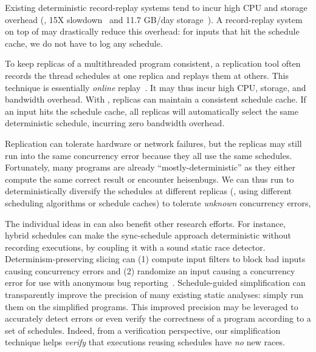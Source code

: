  Existing deterministic record-replay systems
tend to incur high CPU and storage overhead (\eg, 15X
slowdown~\cite{idna:vee06} and 11.7 GB/day
storage~\cite{smp-revirt:vee08}).  A record-replay system on top of \peregrine
may drastically reduce this overhead: for inputs that hit the
schedule cache, we do not have to
log any schedule.

To keep replicas of a multithreaded program consistent, a replication tool
often records the thread schedules at one replica and replays them at
others.  This technique is essentially \emph{online}
replay~\cite{respec:asplos10}.
It may thus incur high CPU, storage, and
bandwidth overhead.  With \peregrine, replicas can maintain a consistent
schedule cache.  If an input hits the schedule cache, all replicas will
automatically select the same deterministic schedule, incurring zero
bandwidth overhead.

  Replication can tolerate
hardware or network failures, but the replicas may still run into the same
concurrency error because they all use the same schedules.  Fortunately,
many programs are already ``mostly-deterministic'' as they either compute
the same correct result or encounter heisenbugs.  We can thus run \peregrine to
deterministically diversify the schedules at different replicas (\eg,
using different scheduling algorithms or schedule caches) to tolerate
\emph{unknown} concurrency errors,

 The individual ideas in \peregrine
can also benefit other research efforts.  For instance, hybrid schedules
can make the sync-schedule approach deterministic without recording
executions, by coupling it with a sound static race detector.
Determinism-preserving slicing can (1) compute input filters to block bad
inputs~\cite{castro:bouncer} causing concurrency errors and (2) randomize
an input causing a concurrency error for use with anonymous bug
reporting~\cite{castro:bug-report-privacy}.  Schedule-guided
simplification can transparently improve the precision of many existing
static analyses: simply run them on the simplified programs.  This improved
precision may be leveraged to accurately detect errors or even
verify the correctness of a program according to a set of schedules.
Indeed, from a verification perspective, our simplification technique
helps \emph{verify} that executions reusing schedules have \emph{no}
new races.

